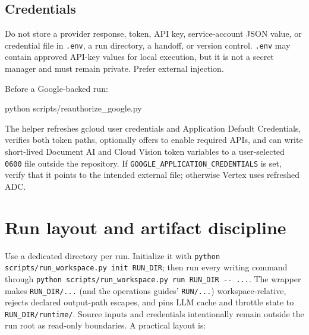 \documentclass[
]{article}
\newenvironment{Shaded}{}{}
\newcommand{\ExtensionTok}[1]{#1}
\newcommand{\NormalTok}[1]{#1}
\begin{document}
\subsection{Credentials}\label{credentials}

Do not store a provider response, token, API key, service-account JSON
value, or credential file in \texttt{.env}, a run directory, a handoff,
or version control. \texttt{.env} may contain approved API-key values
for local execution, but it is not a secret manager and must remain
private. Prefer external injection.

Before a Google-backed run:

\begin{Shaded}
\begin{Highlighting}[]
\ExtensionTok{python}\NormalTok{ scripts/reauthorize\_google.py}
\end{Highlighting}
\end{Shaded}

The helper refreshes gcloud user credentials and Application Default
Credentials, verifies both token paths, optionally offers to enable
required APIs, and can write short-lived Document AI and Cloud Vision
token variables to a user-selected \texttt{0600} file outside the
repository. If
\texttt{GOOGLE\_\allowbreak{}APPLICATION\_\allowbreak{}CREDENTIALS} is
set, verify that it points to the intended external file; otherwise
Vertex uses refreshed ADC.

\section{Run layout and artifact
discipline}\label{run-layout-and-artifact-discipline}

Use a dedicated directory per run. Initialize it with
\texttt{python scripts/\allowbreak{}run\_\allowbreak{}workspace.py init RUN\_\allowbreak{}DIR};
then run every writing command through
\texttt{python scripts/\allowbreak{}run\_\allowbreak{}workspace.py run RUN\_\allowbreak{}DIR -\allowbreak{}-\allowbreak{} ...}.
The wrapper makes \texttt{RUN\_\allowbreak{}DIR/\allowbreak{}...} (and
the operations guides' \texttt{RUN/\allowbreak{}...})
workspace-relative, rejects declared output-path escapes, and pins LLM
cache and throttle state to
\texttt{RUN\_\allowbreak{}DIR/\allowbreak{}runtime/\allowbreak{}}.
Source inputs and credentials intentionally remain outside the run root
as read-only boundaries. A practical layout is:
\end{document}

